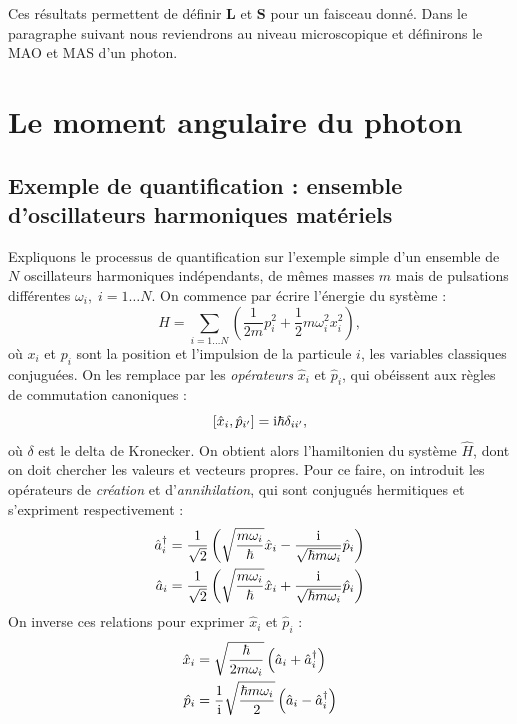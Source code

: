 Ces résultats permettent de définir $\bm{L}$ et $\bm{S}$ pour un faisceau donné. Dans le paragraphe suivant nous reviendrons au niveau microscopique et définirons le MAO et MAS d'un photon.

\section{Le moment angulaire du photon}
\subsection{Exemple de quantification : ensemble d'oscillateurs harmoniques matériels}
Expliquons le processus de quantification sur l'exemple simple d'un ensemble de $N$ oscillateurs harmoniques indépendants, de mêmes masses $m$ mais de pulsations différentes $\omega_{i},\;i=1\ldots N$. On commence par écrire l'énergie du système :
\begin{equation}
H = \sum_{i=1\ldots N}\left(\frac{1}{2 m} p_i^2+\frac{1}{2} m \omega_i^2x_i^2\right),
\label{eq:oscharm1}
\end{equation}
où $x_i$ et $p_i$ sont la position et l'impulsion de la particule $i$, les variables classiques conjuguées. On les remplace par les \textit{opérateurs} $\hat{x}_i$ et $\hat{p}_i$, qui obéissent aux règles de commutation canoniques :
\begin{equation}
\left[\hat{x}_i,\hat{p}_{i'}\right]=\mathrm{i}\hbar\delta_{ii'},
\end{equation}
où $\delta$ est le delta de Kronecker. On obtient alors l'hamiltonien du système $\hat{H}$, dont on doit chercher les valeurs et vecteurs propres. Pour ce faire, on introduit les opérateurs de \textit{création} et d'\textit{annihilation}, qui sont conjugués hermitiques et s'expriment respectivement :
\begin{align}
\hat{a}^{\dag}_{i} &= \frac{1}{\sqrt{2}}\left(\sqrt{\frac{m\omega_i}{\hbar}}\hat{x}_i-\frac{\mathrm{i}}{\sqrt{\hbar m \omega_i}}\hat{p}_{i}\right)\\
\hat{a}_{i} &= \frac{1}{\sqrt{2}}\left(\sqrt{\frac{m\omega_i}{\hbar}}\hat{x}_i+\frac{\mathrm{i}}{\sqrt{\hbar m \omega_i}}\hat{p}_{i}\right)\\
\end{align}
On inverse ces relations pour exprimer $\hat{x}_i$ et $\hat{p}_i$ :
\begin{align}
\hat{x}_i &= \sqrt{\frac{\hbar}{2m\omega_i}}\left(\hat{a}_{i}+\hat{a}^{\dag}_{i}\right)\\
\hat{p}_i &= \frac{1}{\mathrm{i}}\sqrt{\frac{\hbar m\omega_i}{2}}\left(\hat{a}_{i}-\hat{a}^{\dag}_{i}\right)\\
\end{align}
